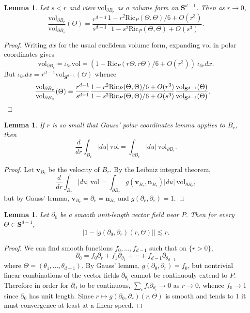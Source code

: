 \documentclass[reqno,12pt,letterpaper]{amsart}
\newcommand{\Sph}{\mathbf S}
\newcommand{\Ric}{\mathrm{Ric}}
\newcommand{\normal}{\mathbf n}
\newcommand{\vol}{\mathrm{vol}}
\newtheorem{lemma}[theorem]{Lemma}
\theoremstyle{definition}
\numberwithin{equation}{section}
\begin{document}
\begin{lemma}\label{rescale the sphere form}
Let $s < r$ and view $\vol_{\partial B_r}$ as a volume form on $\Sph^{d - 1}$.
Then as $r \to 0$,
$$\frac{\vol_{\partial B_r}}{\vol_{\partial B_s}}(\Theta) = \frac{r^{d - 1}}{s^{d - 1}} \frac{1 - r^2 \Ric_P(\Theta, \Theta)/6 + O(r^3)}{1 - s^2 \Ric_P(\Theta, \Theta) + O(s^3)}.$$
\end{lemma}
\begin{proof}
Writing $dx$ for the usual euclidean volume form, expanding $\vol$ in polar coordinates gives
$$\vol_{\partial B_r} = \iota_{\partial r} \vol = (1 - \Ric_P(r\Theta, r\Theta)/6 + O(r^3)) ~\iota_{\partial r} dx.$$
But $\iota_{\partial r} dx = r^{d - 1} \vol_{\Sph^{d - 1}}(\Theta)$ whence
\begin{align*}
\frac{\vol_{\partial B_r}}{\vol_{\partial B_s}}(\Theta) &= \frac{r^{d - 1}}{s^{d - 1}} \frac{1 - r^2 \Ric_P(\Theta, \Theta)/6 + O(r^3)}{1 - s^2 \Ric_P(\Theta, \Theta)/6 +
O(s^3)} \frac{\vol_{\Sph^{d - 1}}(\Theta)}{\vol_{\Sph^{d - 1}}(\Theta)}. \qedhere
\end{align*}
\end{proof}

\begin{lemma}\label{GaussLeibniz}
If $r$ is so small that Gauss' polar coordinates lemma applies to $B_r$, then
$$\frac{d}{dr} \int_{B_r} |du| ~\vol = \int_{\partial B_r} |du| ~\vol_{\partial B_r}.$$
\end{lemma}
\begin{proof}
Let $\mathbf v_{B_r}$ be the velocity of $B_r$.
By the Leibniz integral theorem,
$$\frac{d}{dr} \int_{B_r} |du| ~\vol = \int_{\partial B_r} g(\mathbf v_{B_r}, \normal_{B_r}) |du| ~\vol_{\partial B_r},$$
but by Gauss' lemma, $\mathbf v_{B_r} = \partial_r = \normal_{B_r}$ and $g(\partial_r, \partial_r) = 1$.
\end{proof}

\begin{lemma}\label{quasiradial}
Let $\partial_0$ be a smooth unit-length vector field near $P$. Then for every $\Theta \in \Sph^{d - 1}$,
\begin{equation}\label{quasiradial claim}
|1 - |g(\partial_0, \partial_r)(r, \Theta)|| \lesssim r.
\end{equation}
\end{lemma}
\begin{proof}
We can find smooth functions $f_0, \dots, f_{d - 1}$ such that on $\{r > 0\}$,
$$\partial_0 = f_0 \partial_r + f_1 \partial_{\theta_1} + \cdots + f_{d - 1} \partial_{\theta_{d - 1}}$$
where $\Theta = (\theta_1, \dots, \theta_{d - 1})$.
By Gauss' lemma, $g(\partial_0, \partial_r) = f_0$, but nontrivial linear combinations of the vector fields $\partial_{\theta_i}$ cannot be continuouly extend to $P$.
Therefore in order for $\partial_0$ to be continuous, $\sum_i f_i \partial_{\theta_i} \to 0$ as $r \to 0$, whence $f_0 \to 1$ since $\partial_0$ has unit length.
Since $r \mapsto g(\partial_0, \partial_r)(r, \Theta)$ is smooth and tends to $1$ it must convergence at least at a linear speed.
\end{proof}
\end{document}
